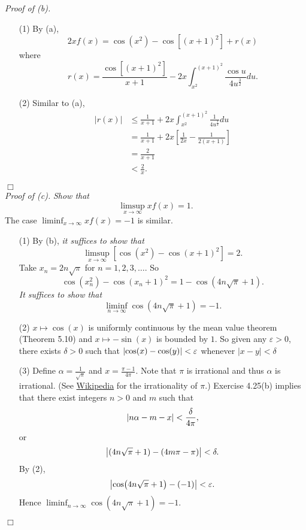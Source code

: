 \documentclass{article}
\begin{document}
\emph{Proof of (b).}
\begin{enumerate}
  \item[(1)]
  By (a),
  \[
    2xf(x) = \cos(x^2) - \cos[(x+1)^2] + r(x)
  \]
  where
  \[
    r(x)
    = \frac{\cos[(x+1)^2]}{x+1}
    - 2x\int_{x^2}^{(x+1)^2} \frac{\cos u}{4u^{\frac{3}{2}}} du.
  \]

  \item[(2)]
  Similar to (a),
  \begin{align*}
    |r(x)|
    &\leq \frac{1}{x+1}
      + 2x \int_{x^2}^{(x+1)^2} \frac{1}{4u^{\frac{3}{2}}} du \\
    &= \frac{1}{x+1}
      + 2x \left[ \frac{1}{2x} - \frac{1}{2(x+1)} \right] \\
    &= \frac{2}{x+1} \\
    &< \frac{2}{x}.
  \end{align*}
\end{enumerate}
$\Box$ \\



\emph{Proof of (c).}
\emph{Show that}
\[
  \limsup_{x \to \infty} x f(x) = 1.
\]
The case $\liminf_{x \to \infty} x f(x) = -1$ is similar.
\begin{enumerate}
  \item[(1)]
  By (b), \emph{it suffices to show that}
  \[
    \limsup_{x \to \infty} \left[ \cos(x^2) - \cos(x+1)^2 \right] = 2.
  \]
  Take $x_n = 2n \sqrt{\pi}$ for $n = 1, 2, 3, \ldots$.
  So
  \[
    \cos(x_n^2) - \cos(x_n+1)^2
    = 1 - \cos(4n\sqrt{\pi} + 1).
  \]
  \emph{It suffices to show that}
  \[
    \liminf_{n \to \infty} \cos(4n\sqrt{\pi} + 1) = -1.
  \]

  \item[(2)]
  $x \mapsto \cos(x)$ is uniformly continuous by the mean value theorem (Theorem 5.10)
  and $x \mapsto -\sin(x)$ is bounded by $1$.
  So given any $\varepsilon > 0$, there exists $\delta > 0$
  such that $\abs{ \cos(x) - \cos(y) } < \varepsilon$
  whenever $|x-y| < \delta$

  \item[(3)]
  Define $\alpha = \frac{1}{\sqrt{\pi}}$ and $x = \frac{\pi-1}{4\pi}$.
  Note that $\pi$ is irrational and thus $\alpha$ is irrational.
  (See
  \href{https://en.wikipedia.org/wiki/Proof_that_%CF%80_is_irrational}{Wikipedia}
  for the irrationality of $\pi$.)
  Exercise 4.25(b) implies that
  there exist integers $n > 0$ and $m$ such that
  \[
    \abs{ n \alpha - m - x } < \frac{\delta}{4\pi},
  \]
  or
  \[
    \abs{ (4n\sqrt{\pi} + 1) - (4m\pi - \pi) } < \delta.
  \]
  By (2),
  \[
    \abs{ \cos(4n\sqrt{\pi} + 1) - (-1) } < \varepsilon.
  \]
  Hence $\liminf_{n \to \infty} \cos(4n\sqrt{\pi} + 1) = -1$.

\end{enumerate}
$\Box$ \\
\end{document}
